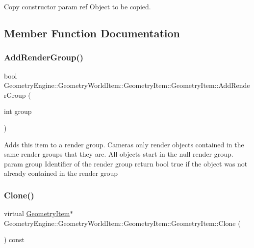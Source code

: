 Copy constructor param ref Object to be copied. 

\subsection{Member Function Documentation}
\mbox{\label{class_geometry_engine_1_1_geometry_world_item_1_1_geometry_item_1_1_geometry_item_adff9d0c0188f96abdbbec182ac1901d8}} 
\subsubsection{\texorpdfstring{AddRenderGroup()}{AddRenderGroup()}}
{\footnotesize\ttfamily bool Geometry\+Engine\+::\+Geometry\+World\+Item\+::\+Geometry\+Item\+::\+Geometry\+Item\+::\+Add\+Render\+Group (\begin{DoxyParamCaption}\item[{int}]{group }\end{DoxyParamCaption})\hspace{0.3cm}{\ttfamily [virtual]}}

Adds this item to a render group. Cameras only render objects contained in the same render groups that they are. All objects start in the null render group. param group Identifier of the render group return bool true if the object was not already contained in the render group \mbox{\label{class_geometry_engine_1_1_geometry_world_item_1_1_geometry_item_1_1_geometry_item_a1db8f97339ba49f746b3e0b4c4b02748}} 
\subsubsection{\texorpdfstring{Clone()}{Clone()}}
{\footnotesize\ttfamily virtual \mbox{\hyperlink{class_geometry_engine_1_1_geometry_world_item_1_1_geometry_item_1_1_geometry_item}{Geometry\+Item}}$\ast$ Geometry\+Engine\+::\+Geometry\+World\+Item\+::\+Geometry\+Item\+::\+Geometry\+Item\+::\+Clone (\begin{DoxyParamCaption}{ }\end{DoxyParamCaption}) const\hspace{0.3cm}{\ttfamily [pure virtual]}}


